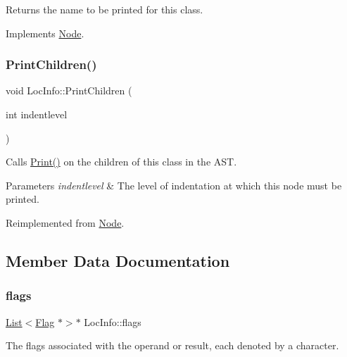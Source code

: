 Returns the name to be printed for this class. 

Implements \hyperlink{class_node_a56e29657306ffb004d69c6929ae44269}{Node}.

\mbox{\label{class_loc_info_ade64091d3ca7267ae2b32307c97426dc}} 
\subsubsection{\texorpdfstring{Print\+Children()}{PrintChildren()}}
{\footnotesize\ttfamily void Loc\+Info\+::\+Print\+Children (\begin{DoxyParamCaption}\item[{int}]{indentlevel }\end{DoxyParamCaption})\hspace{0.3cm}{\ttfamily [virtual]}}

Calls \hyperlink{class_node_a9ef727fd72d1a37792b3db60a8a479dd}{Print()} on the children of this class in the A\+ST. 
\begin{DoxyParams}{Parameters}
{\em indentlevel} & The level of indentation at which this node must be printed. \\
\hline
\end{DoxyParams}


Reimplemented from \hyperlink{class_node_a3e67ec8d22182b721717af14fe0c3000}{Node}.



\subsection{Member Data Documentation}
\mbox{\label{class_loc_info_a4732d45b7e41e9ecd36d1db6ded5bad6}} 
\subsubsection{\texorpdfstring{flags}{flags}}
{\footnotesize\ttfamily \hyperlink{class_list}{List}$<$\hyperlink{class_flag}{Flag} $\ast$$>$$\ast$ Loc\+Info\+::flags\hspace{0.3cm}{\ttfamily [protected]}}

The flags associated with the operand or result, each denoted by a character. \mbox{\label{class_loc_info_a05a5b4ddedff7bbcc41c04f093711987}} 
